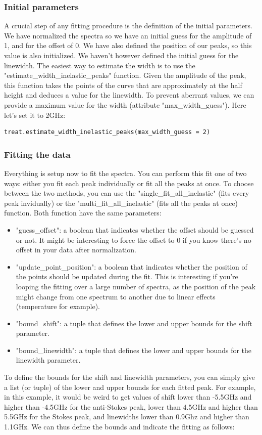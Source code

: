 \documentclass{article}
\begin{document}
\subsubsection{Initial parameters}

A crucial step of any fitting procedure is the definition of the initial parameters. We have normalized the spectra so we have an initial guess for the amplitude of 1, and for the offset of 0. We have also defined the position of our peaks, so this value is also initialized. We haven't however defined the initial guess for the linewidth. The easiest way to estimate the width is to use the "estimate\_width\_inelastic\_peaks" function. Given the amplitude of the peak, this function takes the points of the curve that are approximately at the half height and deduces a value for the linewidth. To prevent aberrant values, we can provide a maximum value for the width (attribute "max\_width\_guess"). Here let's set it to 2GHz:

\begin{lstlisting}
treat.estimate_width_inelastic_peaks(max_width_guess = 2)
\end{lstlisting}

\subsubsection{Fitting the data}

Everything is setup now to fit the spectra. You can perform this fit one of two ways: either you fit each peak individually or fit all the peaks at once. To choose between the two methods, you can use the "single\_fit\_all\_inelastic" (fits every peak invidually) or the "multi\_fit\_all\_inelastic" (fits all the peaks at once) function. Both function have the same parameters:
\begin{itemize}
    \item "guess\_offset": a boolean that indicates whether the offset should be guessed or not. It might be interesting to force the offset to 0 if you know there's no offset in your data after normalization.
    \item "update\_point\_position": a boolean that indicates whether the position of the points should be updated during the fit. This is interesting if you're looping the fitting over a large number of spectra, as the position of the peak might change from one spectrum to another due to linear effects (temperature for example). 
    \item "bound\_shift": a tuple that defines the lower and upper bounds for the shift parameter.
    \item "bound\_linewidth": a tuple that defines the lower and upper bounds for the linewidth parameter.
\end{itemize}
To define the bounds for the shift and linewidth parameters, you can simply give a list (or tuple) of the lower and upper bounds for each fitted peak. For example, in this example, it would be weird to get values of shift lower than -5.5GHz and higher than -4.5GHz for the anti-Stokes peak, lower than 4.5GHz and higher than 5.5GHz for the Stokes peak, and linewidths lower than 0.9Ghz and higher than 1.1GHz. We can thus define the bounds and indicate the fitting as follows:
\end{document}
